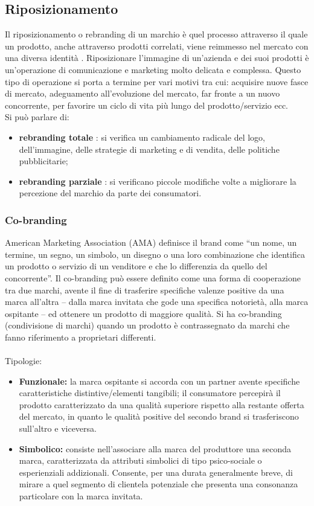 \subsection{Riposizionamento}
Il riposizionamento o rebranding di un marchio è quel processo attraverso il quale un prodotto, anche attraverso prodotti correlati, viene reimmesso nel mercato con una diversa identità .
Riposizionare l’immagine di un’azienda e dei suoi prodotti è un’operazione di comunicazione e marketing molto delicata e complessa. Questo tipo di operazione si porta a termine per vari motivi tra cui: acquisire nuove fasce di mercato, adeguamento all'evoluzione del mercato, far fronte a un nuovo concorrente, per favorire un ciclo di vita più lungo del prodotto/servizio ecc.
\\
Si può parlare di:
\begin{itemize}
\item \textbf{rebranding totale} : si verifica un cambiamento radicale del logo, dell'immagine, delle strategie di marketing e di vendita, delle politiche pubblicitarie;
\item \textbf{rebranding parziale} : si verificano piccole modifiche volte a migliorare la percezione del marchio da parte dei consumatori.
\end{itemize}

\subsubsection{Co-branding}
American Marketing Association (AMA) definisce il brand
come “un nome, un termine, un segno, un simbolo, un
disegno o una loro combinazione che identifica un prodotto
o servizio di un venditore e che lo differenzia da quello del
concorrente”. Il co-branding può essere definito come una forma di cooperazione tra due marchi, avente il fine di trasferire specifiche valenze positive da una marca all’altra – dalla marca invitata che gode una specifica notorietà, alla marca ospitante – ed ottenere un prodotto
di maggiore qualità. Si ha co-branding (condivisione di marchi) quando un prodotto è contrassegnato da marchi che fanno riferimento a proprietari differenti.
\\
\\
Tipologie:
\begin{itemize}
	\item \textbf{Funzionale:} la marca ospitante si accorda con un partner avente specifiche caratteristiche distintive/elementi tangibili; il consumatore percepirà il prodotto caratterizzato da una qualità superiore rispetto alla restante offerta del mercato, in quanto le qualità positive del secondo brand si trasferiscono sull’altro e viceversa.
	\item \textbf{Simbolico:} consiste nell’associare alla marca del produttore una seconda marca, caratterizzata da attributi
	simbolici di tipo psico-sociale o esperienziali addizionali. Consente, per una durata generalmente breve, di mirare a quel segmento di clientela potenziale che presenta una consonanza particolare con la marca invitata.
\end{itemize}

